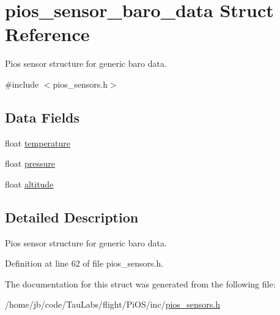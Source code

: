 \hypertarget{structpios__sensor__baro__data}{\section{pios\-\_\-sensor\-\_\-baro\-\_\-data \-Struct \-Reference}
\label{structpios__sensor__baro__data}
}


\-Pios sensor structure for generic baro data.  




{\ttfamily \#include $<$pios\-\_\-sensors.\-h$>$}

\subsection*{\-Data \-Fields}
\begin{DoxyCompactItemize}
\item 
float \hyperlink{group___p_i_o_s___s_e_n_s_o_r_s_ga9cb0c320301d3a8028859d3bf920669f}{temperature}
\item 
float \hyperlink{group___p_i_o_s___s_e_n_s_o_r_s_ga43ba219138a0c31669a1af1b45f7a7f6}{pressure}
\item 
float \hyperlink{group___p_i_o_s___s_e_n_s_o_r_s_ga36e1ee62fc132c0b2c992ef8efc5bb81}{altitude}
\end{DoxyCompactItemize}


\subsection{\-Detailed \-Description}
\-Pios sensor structure for generic baro data. 

\-Definition at line 62 of file pios\-\_\-sensors.\-h.



\-The documentation for this struct was generated from the following file\-:\begin{DoxyCompactItemize}
\item 
/home/jb/code/\-Tau\-Labs/flight/\-Pi\-O\-S/inc/\hyperlink{pios__sensors_8h}{pios\-\_\-sensors.\-h}\end{DoxyCompactItemize}
